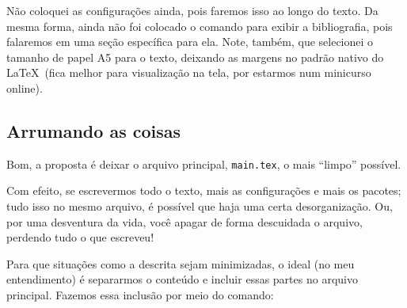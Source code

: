 
Não coloquei as configurações ainda, pois faremos isso ao longo do texto.
Da mesma forma, ainda não foi colocado o comando para exibir a bibliografia, pois 
falaremos em uma seção específica para ela.
Note, também, que selecionei o tamanho de papel \textsf{A5} para o texto, deixando
as margens no padrão nativo do \LaTeX\ (fica melhor para visualização na tela, 
por estarmos num minicurso online).

\subsection{Arrumando as coisas} %

Bom, a proposta é deixar o arquivo principal, \texttt{main.tex}, o mais ``limpo''
possível.

Com efeito, se escrevermos todo o texto, mais as configurações e mais os pacotes;
tudo isso no mesmo arquivo, é possível que haja uma certa desorganização.
Ou, por uma desventura da vida, você apagar de forma descuidada o arquivo, perdendo 
tudo o que escreveu!

Para que situações como a descrita sejam minimizadas, o ideal (no meu entendimento)
é separarmos o conteúdo e incluir essas partes no arquivo principal.
Fazemos essa inclusão por meio do comando:\\

